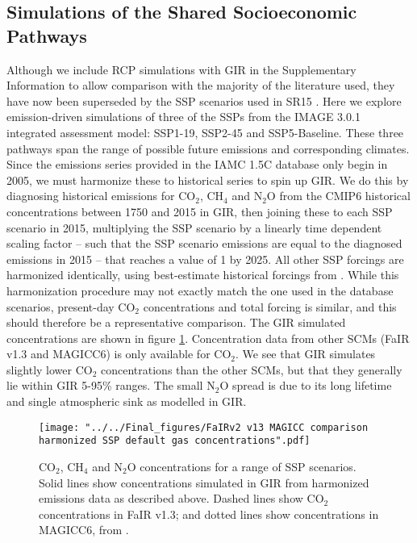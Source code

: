 \documentclass[gmd, manuscript]{copernicus}
\begin{document}
\subsection*{Simulations of the Shared Socioeconomic Pathways}
Although we include RCP simulations with GIR in the Supplementary Information to allow comparison with the majority of the literature used, they have now been superseded by the SSP scenarios used in SR15 \citep{Riahi2017,IPCC2018}. Here we explore emission-driven simulations of three of the SSPs from the IMAGE 3.0.1 integrated assessment model: SSP1-19, SSP2-45 and SSP5-Baseline. These three pathways span the range of possible future emissions and corresponding climates. Since the emissions series provided in the IAMC 1.5C database \citep{Huppmann:2018:scenario-data} only begin in 2005, we must harmonize these to historical series to spin up GIR. We do this by diagnosing historical emissions for CO$_2$, CH$_4$ and N$_2$O from the CMIP6 historical concentrations \citep{Meinshausen2017} between 1750 and 2015 in GIR, then joining these to each SSP scenario in 2015, multiplying the SSP scenario by a linearly time dependent scaling factor -- such that the SSP scenario emissions are equal to the diagnosed emissions in 2015 -- that reaches a value of 1 by 2025. All other SSP forcings are harmonized identically, using best-estimate historical forcings from \cite{Forster2013}. While this harmonization procedure may not exactly match the one used in the database scenarios, present-day CO$_2$ concentrations and total forcing is similar, and this should therefore be a representative comparison. The GIR simulated concentrations are shown in figure \ref{fig:SSPconcs}. Concentration data from other SCMs (FaIR v1.3 and MAGICC6) is only available for CO$_2$. We see that GIR simulates slightly lower CO$_2$ concentrations than the other SCMs, but that they generally lie within GIR 5-95\% ranges. The small N$_2$O spread is due to its long lifetime and single atmospheric sink as modelled in GIR.\\
\begin{figure}[t]
    \texttt{[image: "../../Final\_figures/FaIRv2 v13 MAGICC comparison harmonized SSP default gas concentrations".pdf]}
    \caption{CO$_2$, CH$_4$ and N$_2$O concentrations for a range of SSP scenarios. Solid lines show concentrations simulated in GIR from harmonized emissions data as described above. Dashed lines show CO$_2$ concentrations in FaIR v1.3; and dotted lines show concentrations in MAGICC6, from \cite{Huppmann:2018:scenario-data}.}
    \label{fig:SSPconcs}
\end{figure}
\end{document}
